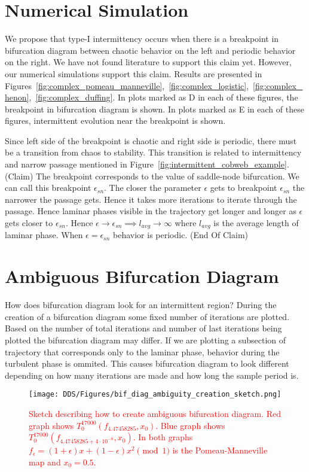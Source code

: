 \section{Numerical Simulation}
We propose that type-I intermittency occurs when there is a breakpoint in bifurcation diagram between chaotic behavior on the left and periodic behavior on the right.
We have not found literature to support this claim yet.
However, our numerical simulations support this claim.
Results are presented in Figures~\ref{fig:complex_pomeau_manneville},~\ref{fig:complex_logistic},~\ref{fig:complex_henon},~\ref{fig:complex_duffing}.
In plots marked as D in each of these figures, the breakpoint in bifurcation diagram is shown.
In plots marked as E in each of these figures, intermittent evolution near the breakpoint is shown.
\par
Since left side of the breakpoint is chaotic and right side is periodic, there must be a transition from chaos to stability.
This transition is related to intermittency and narrow passage mentioned in Figure~\ref{fig:intermittent_cobweb_example}.
(Claim) The breakpoint corresponds to the value of saddle-node bifurcation.
We can call this breakpoint $\epsilon_{sn}$.
The closer the parameter $\epsilon$ gets to breakpoint $\epsilon_{sn}$ the narrower the passage gets.
Hence it takes more iterations to iterate through the passage.
Hence laminar phases visible in the trajectory get longer and longer as $\epsilon$ gets closer to $\epsilon_{sn}$.
Hence $\epsilon \rightarrow \epsilon_{sn} \implies l_{avg} \rightarrow \infty$ where $l_{avg}$ is the average length of laminar phase.
When $\epsilon = \epsilon_{sn}$ behavior is periodic.
(End Of Claim)

\section{Ambiguous Bifurcation Diagram}
\label{sec:ambiguous_bif_diag}
How does bifurcation diagram look for an intermittent region?
During the creation of a bifurcation diagram some fixed number of iterations are plotted.
Based on the number of total iterations and number of last iterations being plotted the bifurcation diagram may differ.
If we are plotting a subsection of trajectory that corresponds only to the laminar phase, behavior during the turbulent phase is ommited.
This causes bifurcation diagram to look different depending on how many iterations are made and how long the sample period is.
\par
\begin{figure}[!h]
    \centering
    \texttt{[image: DDS/Figures/bif\_diag\_ambiguity\_creation\_sketch.png]}
    \caption{
        \textcolor{red}{
        Sketch describing how to create ambiguous bifurcation diagram. 
        Red graph shows $T^{17000}_{0}(f_{4.47458285}, x_0)$. 
        Blue graph shows $T^{17000}_{0}(f_{4.47458285+4 \cdot 10^{-8}}, x_0)$. 
        In both graphs $f_{\epsilon} = (1+\epsilon)x+(1-\epsilon)x^2 \pmod{1}$ is the Pomeau-Manneville map and $x_0 = 0.5$.
        }
    }
    \label{fig:ambiguous_bif_diag}
\end{figure}


